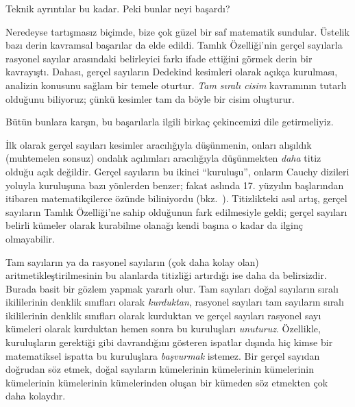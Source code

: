 \documentclass[../../../include/open-logic-section]{subfiles}
\begin{document}

Teknik ayrıntılar bu kadar. Peki bunlar neyi başardı?

Neredeyse tartışmasız biçimde, bize çok {güzel} bir saf matematik sundular.
Üstelik bazı derin kavramsal başarılar da elde edildi. Tamlık Özelliği'nin gerçel
sayılarla rasyonel sayılar arasındaki belirleyici farkı ifade ettiğini görmek
derin bir kavrayıştı. Dahası, gerçel sayıların Dedekind kesimleri olarak açıkça
kurulması, analizin konusunu sağlam bir temele oturtur. \emph{Tam sıralı
cisim} kavramının tutarlı olduğunu biliyoruz; çünkü kesimler tam da böyle bir
cisim oluşturur.

Bütün bunlara karşın, bu başarılarla ilgili birkaç çekincemizi dile
getirmeliyiz.

İlk olarak gerçel sayıları kesimler aracılığıyla düşünmenin, onları alışıldık
(muhtemelen sonsuz) ondalık açılımları aracılığıyla düşünmekten
\emph{daha} titiz olduğu açık değildir. Gerçel sayıların bu ikinci “kuruluşu”,
onların Cauchy dizileri yoluyla kuruluşuna bazı yönlerden benzer; fakat aslında
17. yüzyılın başlarından itibaren matematikçilerce özünde biliniyordu
(bkz.\ ). Titizlikteki asıl artış, gerçel sayıların Tamlık
Özelliği'ne sahip olduğunun fark edilmesiyle geldi; gerçel sayıları belirli
kümeler olarak kurabilme olanağı kendi başına o kadar da ilginç olmayabilir.

Tam sayıların ya da rasyonel sayıların (çok daha kolay olan)
aritmetikleştirilmesinin bu alanlarda titizliği artırdığı ise daha da
belirsizdir. Burada basit bir gözlem yapmak yararlı olur. Tam sayıları doğal
sayıların sıralı ikililerinin denklik sınıfları olarak \emph{kurduktan},
rasyonel sayıları tam sayıların sıralı ikililerinin denklik sınıfları olarak
kurduktan ve gerçel sayıları rasyonel sayı kümeleri olarak kurduktan hemen sonra
bu kuruluşları \emph{unuturuz}. Özellikle, kuruluşların gerektiği gibi
davrandığını gösteren ispatlar dışında hiç kimse bir matematiksel ispatta bu
kuruluşlara \emph{başvurmak} istemez. Bir gerçel sayıdan doğrudan söz etmek,
doğal sayıların kümelerinin kümelerinin kümelerinin kümelerinin kümelerinin
kümelerinden oluşan bir kümeden söz etmekten çok daha kolaydır.
%
%
%
	
\end{document}
